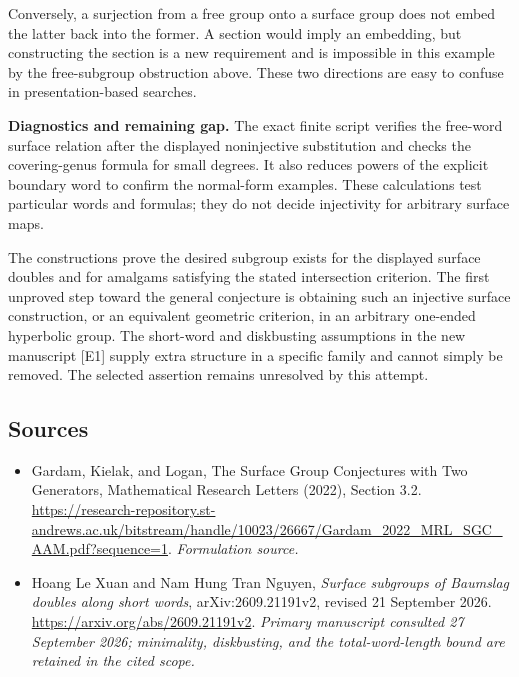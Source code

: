 \documentclass[11pt]{article}
\begin{document}
Conversely, a surjection from a free group onto a surface group does not embed the latter back into the former. A section would imply an embedding, but constructing the section is a new requirement and is impossible in this example by the free-subgroup obstruction above. These two directions are easy to confuse in presentation-based searches.

\textbf{Diagnostics and remaining gap.} The exact finite script verifies the free-word surface relation after the displayed noninjective substitution and checks the covering-genus formula for small degrees. It also reduces powers of the explicit boundary word to confirm the normal-form examples. These calculations test particular words and formulas; they do not decide injectivity for arbitrary surface maps.

The constructions prove the desired subgroup exists for the displayed surface doubles and for amalgams satisfying the stated intersection criterion. The first unproved step toward the general conjecture is obtaining such an injective surface construction, or an equivalent geometric criterion, in an arbitrary one-ended hyperbolic group. The short-word and diskbusting assumptions in the new manuscript [E1] supply extra structure in a specific family and cannot simply be removed. The selected assertion remains unresolved by this attempt.

\subsection{Sources}
\begin{itemize}
\item[S1]Gardam, Kielak, and Logan, The Surface Group Conjectures with Two Generators, Mathematical Research Letters (2022), Section 3.2.
\url{https://research-repository.st-andrews.ac.uk/bitstream/handle/10023/26667/Gardam_2022_MRL_SGC_AAM.pdf?sequence=1}.
\textit{Formulation source.}
\item[E1]Hoang Le Xuan and Nam Hung Tran Nguyen, \emph{Surface subgroups of Baumslag doubles along short words}, arXiv:2609.21191v2, revised 21 September 2026.
\url{https://arxiv.org/abs/2609.21191v2}.
\textit{Primary manuscript consulted 27 September 2026; minimality, diskbusting, and the total-word-length bound are retained in the cited scope.}
\end{itemize}
\end{document}
